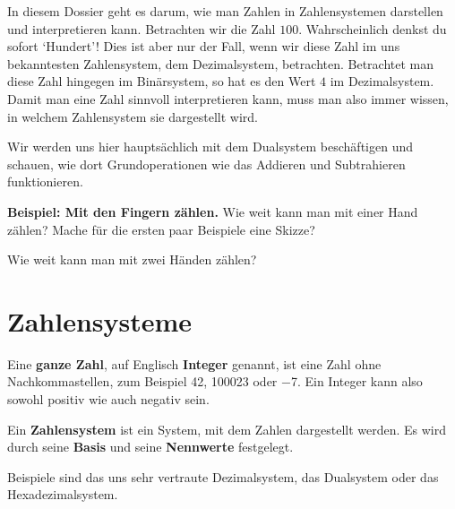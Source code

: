 In diesem Dossier geht es darum, wie man Zahlen in Zahlensystemen darstellen und interpretieren kann. Betrachten wir die Zahl $100$. Wahrscheinlich denkst du sofort `Hundert'! Dies ist aber nur der Fall, wenn wir diese Zahl im uns bekanntesten Zahlensystem, dem Dezimalsystem, betrachten. Betrachtet man diese Zahl hingegen im Binärsystem, so hat es den Wert $4$ im Dezimalsystem. Damit man eine Zahl sinnvoll interpretieren kann, muss man also immer wissen, in welchem Zahlensystem sie dargestellt wird.

Wir werden uns hier hauptsächlich mit dem Dualsystem beschäftigen und schauen, wie dort Grundoperationen wie das Addieren und Subtrahieren funktionieren.


\textbf{Beispiel: Mit den Fingern zählen.} Wie weit kann man mit einer Hand zählen? Mache für die ersten paar Beispiele eine Skizze?


Wie weit kann man mit zwei Händen zählen?


\newpage

\section{Zahlensysteme}

Eine \textbf{ganze Zahl}, auf Englisch \textbf{Integer} genannt, ist eine Zahl ohne Nachkommastellen, zum Beispiel \num{42}, \num{100023} oder \num{-7}. Ein Integer kann also sowohl positiv wie auch negativ sein.

\begin{definition}
	Ein \textbf{Zahlensystem} ist ein System, mit dem Zahlen dargestellt werden. Es wird durch seine \textbf{Basis} und seine \textbf{Nennwerte} festgelegt.

	Beispiele sind das uns sehr vertraute Dezimalsystem, das Dualsystem oder das Hexadezimalsystem.
\end{definition}

